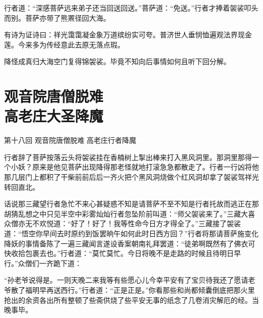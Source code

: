 \documentclass[12pt,UTF8]{ctexbook}
\begin{document}
{行者道：“深感菩萨远来弟子还当回送回送。”菩萨道：“免送。”行者才捧着袈裟叩头而别。菩萨亦带了熊罴径回大海。

有诗为证诗曰：祥光霭霭凝金象万道缤纷实可夸。普济世人垂悯恤遍观法界现金莲。今来多为传经意此去原无落点瑕。

降怪成真归大海空门复得锦袈裟。毕竟不知向后事情如何且听下回分解。

\chapter[观音院唐僧脱难\ 高老庄大圣降魔]{观音院唐僧脱难\\高老庄大圣降魔}

第十八回 观音院唐僧脱难 高老庄行者降魔

行者辞了菩萨按落云头将袈裟挂在香楠树上掣出棒来打入黑风洞里。那洞里那得一个小妖？原来是他见菩萨出现降得那老怪就地打滚急急都散走了。行者一行凶将他那几层门上都积了干柴前前后后一齐火把个黑风洞烧做个红风洞却拿了袈裟驾祥光转回直北。

话说那三藏望行者急忙不来心甚疑惑不知是请菩萨不至不知是行者托故而逃正在那胡猜乱想之中只见半空中彩雾灿灿行者忽坠阶前叫道：“师父袈裟来了。”三藏大喜众僧亦无不欢悦道：“好了！好了！我等性命今日方才得全了。”三藏接了袈裟道：“悟空你早间去时原约到饭罢晌午如何此时日西方回？”行者将那请菩萨施变化降妖的事情备陈了一遍三藏闻言遂设香案朝南礼拜罢道：“徒弟啊既然有了佛衣可快收拾包裹去也。”行者道：“莫忙莫忙。今日将晚不是走路的时候且待明日早行。”众僧们一齐跪下道：

“孙老爷说得是。一则天晚二来我等有些愿心儿今幸平安有了宝贝待我还了愿请老爷散了福明早再送西行。”行者道：“正是正是。”你看那些和尚都倾囊倒底把那火里抢出的余资各出所有整顿了些斋供烧了些平安无事的纸念了几卷消灾解厄的经。当晚事毕。

}
\end{document}
